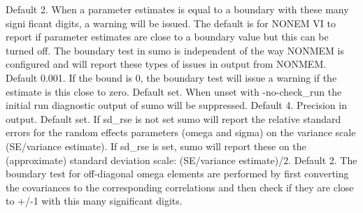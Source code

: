 \begin{optionlist}
\nextopt
{}
Default 2. When a parameter estimates is equal to a boundary with these many signi ficant digits, a warning will be issued. The default is for NONEM VI to report if parameter estimates are close to a boundary value but this can be turned off. The boundary test in sumo is independent of the way NONMEM is configured and will report these types of issues in output from NONMEM. 
\nextopt
{}
Default 0.001. If the bound is 0, the boundary test will issue a warning if the estimate is this close to zero. 
\nextopt
{}
Default set. When unset with -no-check\_run the initial run diagnostic output of sumo will be suppressed. 
\nextopt
{}
Default 4. Precision in output.  
\nextopt
{}
Default set. If sd\_rse is not set sumo will report the relative standard errors for the random effects parameters (omega and sigma) on the variance scale (SE/variance estimate). If sd\_rse is set, sumo will report these on the (approximate) standard deviation scale: (SE/variance estimate)/2. 
\nextopt
{}
Default 2. The boundary test for off-diagonal omega elements are performed by first converting the covariances to the corresponding correlations and then check if they are close to +/-1 with this many significant digits.  
\nextopt
\end{optionlist}


